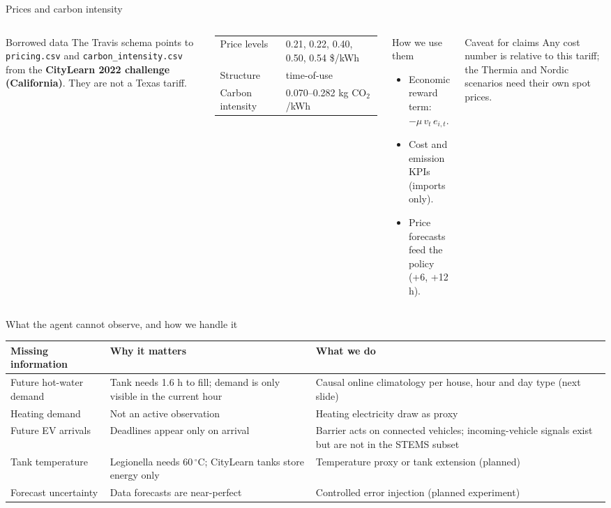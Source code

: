 \documentclass[aspectratio=169,10pt]{beamer}
\begin{document}
\begin{frame}{Prices and carbon intensity}
\begin{columns}[T]
\begin{alertblock}{Borrowed data}
The Travis schema points to \texttt{pricing.csv} and \texttt{carbon\_intensity.csv} from the \textbf{CityLearn 2022 challenge (California)}. They are not a Texas tariff.
\end{alertblock}
\small
\begin{tabular}{@{}ll@{}}
\toprule
Price levels & 0.21, 0.22, 0.40, 0.50, 0.54 \$/kWh \\
Structure & time-of-use \\
Carbon intensity & 0.070--0.282 kg CO$_2$/kWh \\
\bottomrule
\end{tabular}
\begin{block}{How we use them}
\begin{itemize}
  \item Economic reward term: $-\mu\, v_t\, e_{i,t}$.
  \item Cost and emission KPIs (imports only).
  \item Price forecasts feed the policy (+6, +12 h).
\end{itemize}
\end{block}
\begin{block}{Caveat for claims}
Any cost number is relative to this tariff; the Thermia and Nordic scenarios need their own spot prices.
\end{block}
\end{columns}
\end{frame}

\begin{frame}{What the agent cannot observe, and how we handle it}
\small
\begin{tabularx}{\textwidth}{@{}>{\raggedright\arraybackslash}p{3.3cm}>{\raggedright\arraybackslash}X>{\raggedright\arraybackslash}p{4.8cm}@{}}
\toprule
Missing information & Why it matters & What we do \\
\midrule
Future hot-water demand & Tank needs 1.6 h to fill; demand is only visible in the current hour & Causal online climatology per house, hour and day type (next slide) \\
Heating demand & Not an active observation & Heating electricity draw as proxy \\
Future EV arrivals & Deadlines appear only on arrival & Barrier acts on connected vehicles; incoming-vehicle signals exist but are not in the STEMS subset \\
Tank temperature & Legionella needs 60\,$^\circ$C; CityLearn tanks store energy only & Temperature proxy or tank extension (planned) \\
Forecast uncertainty & Data forecasts are near-perfect & Controlled error injection (planned experiment) \\
\bottomrule
\end{tabularx}
\end{frame}
\end{document}

